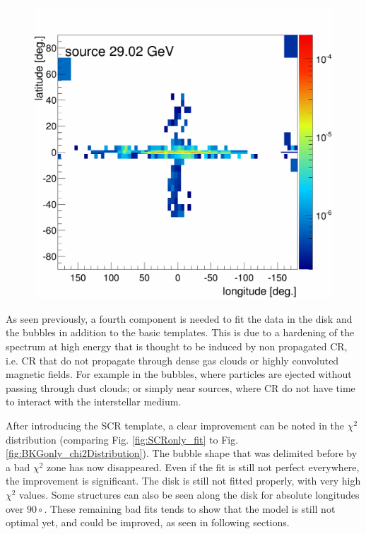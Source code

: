 \begin{figure}[h]
\begin{minipage}[h]{0.45\textwidth}
	  \includegraphics[width=1.\linewidth]{pic/results/SCR_flux_distribution_bin20.png}
	  \label{fig:BKGonly_bubble_spec}
  \end{minipage}
  \label{fig:SCRonly_distributions}
\end{figure}


As seen previously, a fourth component is needed to fit the data in the disk and the bubbles in addition to the basic templates. This is due to a hardening of the spectrum at high energy that is thought to be induced by non propagated CR, i.e. CR that do not propagate through dense gas clouds or highly convoluted magnetic fields. For example in the bubbles, where particles are ejected without passing through dust clouds; or simply near sources, where CR do not have time to interact with the interstellar medium.


After introducing the SCR template, a clear improvement can be noted in the $\chi^2$ distribution (comparing Fig. \ref{fig:SCRonly_fit} to Fig. \ref{fig:BKGonly_chi2Distribution}). The bubble shape that was delimited before by a bad $\chi^2$ zone has now disappeared. Even if the fit is still not perfect everywhere, the improvement is significant.
The disk is still not fitted properly, with very high $\chi^2$ values. Some structures can also be seen along the disk for absolute longitudes over $90\circ$. These remaining bad fits tends to show that the model is still not optimal yet, and could be improved, as seen in following sections.

